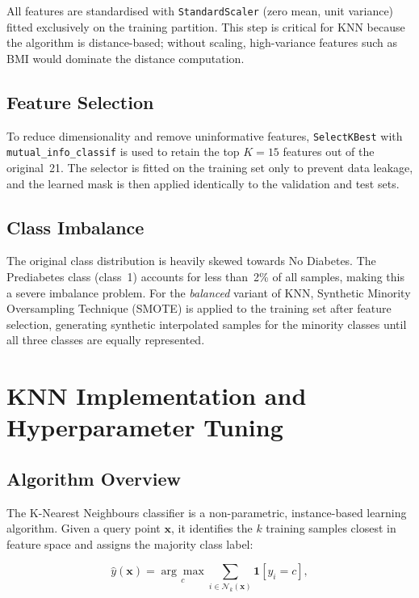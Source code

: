 \documentclass[12pt,a4paper]{article}
\begin{document}
All features are standardised with \texttt{StandardScaler} (zero mean,
unit variance) fitted exclusively on the training partition.  
This step is critical for KNN because the algorithm is distance-based; without
scaling, high-variance features such as BMI would dominate the distance
computation.

\subsection{Feature Selection}

To reduce dimensionality and remove uninformative features, \texttt{SelectKBest}
with \texttt{mutual\_info\_classif} is used to retain the top $K = 15$ features
out of the original~21.  
The selector is fitted on the training set only to prevent data leakage, and the
learned mask is then applied identically to the validation and test sets.

\subsection{Class Imbalance}

The original class distribution is heavily skewed towards No Diabetes.  
The Prediabetes class (class~1) accounts for less than~2\% of all samples, making
this a severe imbalance problem.  
For the \textit{balanced} variant of KNN, Synthetic Minority Oversampling
Technique (SMOTE) is applied to the training set after feature selection, generating
synthetic interpolated samples for the minority classes until all three classes are
equally represented.

\section{KNN Implementation and Hyperparameter Tuning}

\subsection{Algorithm Overview}

The K-Nearest Neighbours classifier is a non-parametric, instance-based learning
algorithm.  Given a query point $\mathbf{x}$, it identifies the $k$ training
samples closest in feature space and assigns the majority class label:

\[
  \hat{y}(\mathbf{x}) = \underset{c}{\arg\max}
  \sum_{i \in \mathcal{N}_k(\mathbf{x})} \mathbf{1}[y_i = c],
\]
\end{document}
